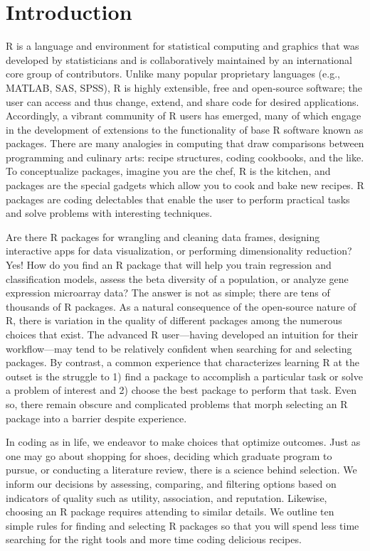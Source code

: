 \documentclass[10pt,letterpaper]{article}
\begin{document}
\hypertarget{introduction}{%
\section{Introduction}\label{introduction}}

R is a language and environment for statistical computing and graphics
that was developed by statisticians and is collaboratively maintained by
an international core group of contributors. Unlike many popular
proprietary languages (e.g., MATLAB, SAS, SPSS), R is highly extensible,
free and open-source software; the user can access and thus change,
extend, and share code for desired applications. Accordingly, a vibrant
community of R users has emerged, many of which engage in the
development of extensions to the functionality of base R software known
as packages. There are many analogies in computing that draw comparisons
between programming and culinary arts: recipe structures, coding
cookbooks, and the like. To conceptualize packages, imagine you are the
chef, R is the kitchen, and packages are the special gadgets which allow
you to cook and bake new recipes. R packages are coding delectables that
enable the user to perform practical tasks and solve problems with
interesting techniques.

Are there R packages for wrangling and cleaning data frames, designing
interactive apps for data visualization, or performing dimensionality
reduction? Yes! How do you find an R package that will help you train
regression and classification models, assess the beta diversity of a
population, or analyze gene expression microarray data? The answer is
not as simple; there are tens of thousands of R packages. As a natural
consequence of the open-source nature of R, there is variation in the
quality of different packages among the numerous choices that exist. The
advanced R user---having developed an intuition for their workflow---may
tend to be relatively confident when searching for and selecting
packages. By contrast, a common experience that characterizes learning R
at the outset is the struggle to 1) find a package to accomplish a
particular task or solve a problem of interest and 2) choose the best
package to perform that task. Even so, there remain obscure and
complicated problems that morph selecting an R package into a barrier
despite experience.

In coding as in life, we endeavor to make choices that optimize
outcomes. Just as one may go about shopping for shoes, deciding which
graduate program to pursue, or conducting a literature review, there is
a science behind selection. We inform our decisions by assessing,
comparing, and filtering options based on indicators of quality such as
utility, association, and reputation. Likewise, choosing an R package
requires attending to similar details. We outline ten simple rules for
finding and selecting R packages so that you will spend less time
searching for the right tools and more time coding delicious recipes.
\end{document}
